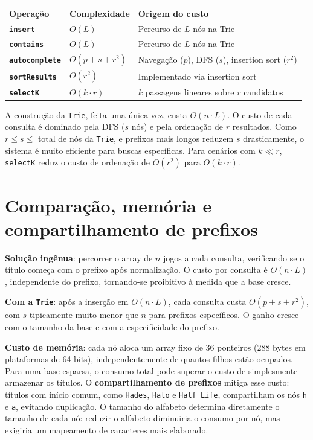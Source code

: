 \documentclass[11pt,a4paper]{article}
\begin{document}
\begin{center}
\begin{tabular}{>{\bfseries}lll}
\toprule
Operação & Complexidade & Origem do custo \\
\midrule
\texttt{insert}         & $O(L)$                  & Percurso de $L$ nós na Trie \\
\texttt{contains}       & $O(L)$                  & Percurso de $L$ nós na Trie \\
\texttt{autocomplete}   & $O(p + s + r^2)$          & Navegação ($p$), DFS ($s$), insertion sort ($r^2$) \\
\texttt{sortResults}        & $O(r^2)$          & Implementado via insertion sort \\
\texttt{selectK}        & $O(k \cdot r)$          & $k$ passagens lineares sobre $r$ candidatos \\
\bottomrule
\end{tabular}
\end{center}
 
A construção da \texttt{Trie}, feita uma única vez, custa $O(n \cdot L)$. O custo de cada consulta é dominado pela DFS ($s$ nós) e pela ordenação de $r$ resultados. Como $r \leq s \leq$ total de nós da \texttt{Trie}, e prefixos mais longos reduzem $s$ drasticamente, o sistema é muito eficiente para buscas específicas. Para cenários com $k \ll r$, \texttt{selectK} reduz o custo de ordenação de $O(r^2)$ para $O(k \cdot r)$.
 
\section*{Comparação, memória e compartilhamento de prefixos}
 
\textbf{Solução ingênua}: percorrer o array de $n$ jogos a cada consulta, verificando se o título começa com o prefixo após normalização. O custo por consulta é $O(n \cdot L)$, independente do prefixo, tornando-se proibitivo à medida que a base cresce.
 
\textbf{Com a \texttt{Trie}}: após a inserção em $O(n \cdot L)$, cada consulta custa $O(p + s + r^2)$, com $s$ tipicamente muito menor que $n$ para prefixos específicos. O ganho cresce com o tamanho da base e com a especificidade do prefixo.
 
\textbf{Custo de memória}: cada nó aloca um array fixo de 36 ponteiros (288 bytes em plataformas de 64 bits), independentemente de quantos filhos estão ocupados. Para uma base esparsa, o consumo total pode superar o custo de simplesmente armazenar os títulos. O \textbf{compartilhamento de prefixos} mitiga esse custo: títulos com início comum, como \texttt{Hades}, \texttt{Halo} e \texttt{Half Life}, compartilham os nós \texttt{h} e \texttt{a}, evitando duplicação. O tamanho do alfabeto determina diretamente o tamanho de cada nó: reduzir o alfabeto diminuiria o consumo por nó, mas exigiria um mapeamento de caracteres mais elaborado.
 
\end{document}
